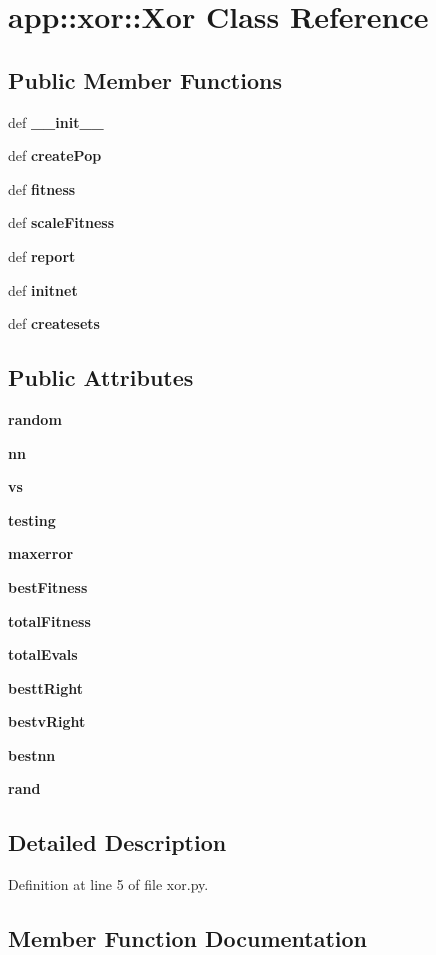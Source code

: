 \section{app::xor::Xor Class Reference}
\label{classapp_1_1xor_1_1Xor}
\subsection*{Public Member Functions}
\begin{CompactItemize}
\item 
def {\bf \_\-\_\-init\_\-\_\-}
\item 
def {\bf createPop}
\item 
def {\bf fitness}
\item 
def {\bf scaleFitness}
\item 
def {\bf report}
\item 
def {\bf initnet}
\item 
def {\bf createsets}
\end{CompactItemize}
\subsection*{Public Attributes}
\begin{CompactItemize}
\item 
{\bf random}
\item 
{\bf nn}
\item 
{\bf vs}
\item 
{\bf testing}
\item 
{\bf maxerror}
\item 
{\bf bestFitness}
\item 
{\bf totalFitness}
\item 
{\bf totalEvals}
\item 
{\bf besttRight}
\item 
{\bf bestvRight}
\item 
{\bf bestnn}
\item 
{\bf rand}
\end{CompactItemize}


\subsection{Detailed Description}


Definition at line 5 of file xor.py.

\subsection{Member Function Documentation}
